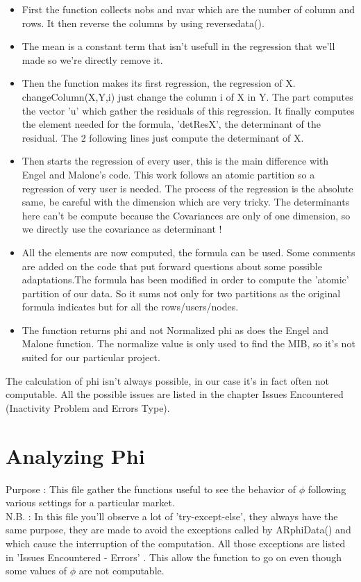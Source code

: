 \documentclass{report}
\begin{document}
\begin{itemize}
\item First the function collects nobs and nvar which are the number of column and rows. It then reverse the columns by using reversedata().
\item The mean is a constant term that isn't usefull in the regression that we'll made so we're directly remove it.
\item Then the function makes its first regression, the regression of X. changeColumn(X,Y,i) just change the column i of X in Y. The part computes the vector 'u' which gather the residuals of this regression. It finally computes the element needed for the formula, 'detResX', the determinant of the residual. The 2 following lines just compute the determinant of X.
\item Then starts the regression of every user, this is the main difference with Engel and Malone's code. This work follows an atomic partition so a regression of very user is needed. The process of the regression is the absolute same, be careful with the dimension which are very tricky. The determinants here can't be compute because the Covariances are only of one dimension, so we directly use the covariance as determinant ! 
\item All the elements are now computed, the formula can be used. Some comments are added on the code that put forward questions about some possible adaptations.The formula has been modified in order to compute the 'atomic' partition of our data. So it sums not only for two partitions as the original formula indicates but for all the rows/users/nodes.
\item The function returns phi and not Normalized phi as does the Engel and Malone function. The normalize value is only used to find the MIB, so it's not suited for our particular project.
\end{itemize}

The calculation of phi isn't always possible, in our case it's in fact often not computable. All the possible issues are listed in the chapter Issues Encountered (Inactivity Problem and Errors Type).

\section{Analyzing Phi}

Purpose : This file gather the functions useful to see the behavior of $\phi $ following various settings for a particular market. \\
N.B. : In this file you'll observe a lot of 'try-except-else', they always have the same purpose, they are made to avoid the exceptions called by ARphiData() and which cause the interruption of the computation. All those exceptions are listed in 'Issues Encountered - Errors' . This allow the function to go on even though some values of $\phi $ are not computable.
\end{document}

